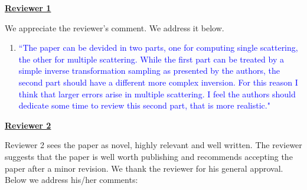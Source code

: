 \documentclass[12pt]{article}
\begin{document}
\noindent \underline {\bf Reviewer 1}

We appreciate the reviewer's comment. We address it below.

\begin{enumerate}

\item \textcolor{blue}{ ``The paper can be devided in two parts, one
    for computing single scattering, the other for multiple
    scattering. While the first part can be treated by a simple
    inverse transformation sampling as presented by the authors, the
    second part should have a different more complex inversion. For
    this reason I think that larger errors arise in multiple
    scattering. I feel the authors should dedicate some time to review
    this second part, that is more realistic."}

  {}

\end{enumerate}

\noindent \underline {\bf Reviewer 2}

Reviewer 2 sees the paper as novel, highly relevant and well written.
The reviewer suggests that the paper is well worth publishing and
recommends accepting the paper after a minor revision.  We thank the
reviewer for his general approval. Below we address his/her comments:
\end{document}
